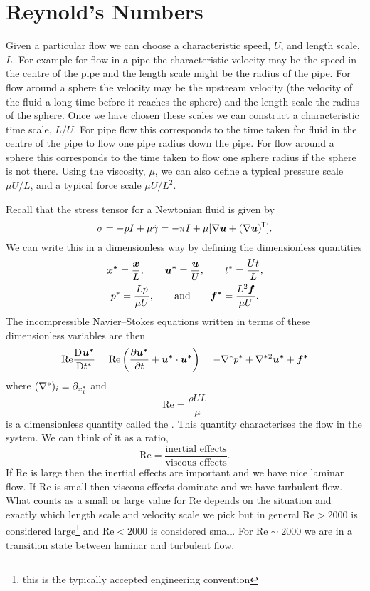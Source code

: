 \documentclass[a4paper]{article}
\renewcommand{\ident}{I}
\newcommand{\mdv}[3][]{\frac{\mathrm{D}^{#1} #2}{\mathrm{D} {#3}^{#1}}}
\newcommand{\reynoldsNumber}{\mathrm{Re}}
\begin{document}
    \section{Reynold's Numbers}
    Given a particular flow we can choose a characteristic speed, \(U\), and length scale, \(L\).
    For example for flow in a pipe the characteristic velocity may be the speed in the centre of the pipe and the length scale might be the radius of the pipe.
    For flow around a sphere the velocity may be the upstream velocity (the velocity of the fluid a long time before it reaches the sphere) and the length scale the radius of the sphere.
    Once we have chosen these scales we can construct a characteristic time scale, \(L/U\).
    For pipe flow this corresponds to the time taken for fluid in the centre of the pipe to flow one pipe radius down the pipe.
    For flow around a sphere this corresponds to the time taken to flow one sphere radius if the sphere is not there.
    Using the viscosity, \(\mu\), we can also define a typical pressure scale \(\mu U/L\), and a typical force scale \(\mu U/L^2\).
    
    Recall that the stress tensor for a Newtonian fluid is given by
    \[\sigma = -p\ident + \mu\dot{\gamma} = -\pi\ident + \mu[\grad\vv{u} + (\grad\vv{u})\trans].\]
    We can write this in a dimensionless way by defining the dimensionless quantities
    \begin{gather*}
        \bm{x^*}  = \frac{\bm{x}}{L}, \qquad \bm{u^*} = \frac{\bm{u}}{U}, \qquad  t^* = \frac{Ut}{L},\\
        p^* = \frac{Lp}{\mu U}, \qquad\text{and}\qquad \bm{f^*} = \frac{L^2\bm{f}}{\mu U}.
    \end{gather*}
    The incompressible Navier--Stokes equations written in terms of these dimensionless variables are then
    \[\reynoldsNumber\mdv{\vv{u^*}}{t^*} = \reynoldsNumber\left( \pdv{\vv{u^*}}{t} + \vv{u^*}\cdot\vv{u^*} \right) = -\grad^*p^* + \grad^*{^2}\vv{u^*} + \vv{f^*}\]
    where \((\nabla^*)_i = \partial_{x_i^*}\) and
    \[\reynoldsNumber = \frac{\rho U L}{\mu}\]
    is a dimensionless quantity called the .
    This quantity characterises the flow in the system.
    We can think of it as a ratio,
    \[\reynoldsNumber = \frac{\text{inertial effects}}{\text{viscous effects}}.\]
    If \(\reynoldsNumber\) is large then the inertial effects are important and we have nice laminar flow.
    If \(\reynoldsNumber\) is small then viscous effects dominate and we have turbulent flow.
    What counts as a small or large value for \(\reynoldsNumber\) depends on the situation and exactly which length scale and velocity scale we pick but in general \(\reynoldsNumber > 2000\) is considered large\footnote{this is the typically accepted engineering convention} and \(\reynoldsNumber < 2000\) is considered small.
    For \(\reynoldsNumber \sim 2000\) we are in a transition state between laminar and turbulent flow.
    
\end{document}
